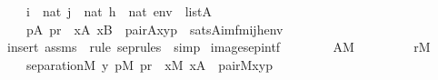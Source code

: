\begin{isabellebody}
\ \ \ \ {\isachardoublequoteopen}i\ {\isasymin}\ nat{\isachardoublequoteclose}\ {\isachardoublequoteopen}j\ {\isasymin}\ nat{\isachardoublequoteclose}\ {\isachardoublequoteopen}h\ {\isasymin}\ nat{\isachardoublequoteclose}\ {\isachardoublequoteopen}env\ {\isasymin}\ list{\isacharparenleft}{\kern0pt}A{\isacharparenright}{\kern0pt}{\isachardoublequoteclose}\isanewline
\ \ \isanewline
\ \ \ \ {\isachardoublequoteopen}{\isacharparenleft}{\kern0pt}{\isasymexists}p{\isasymin}A{\isachardot}{\kern0pt}\ p{\isasymin}r\ {\isacharampersand}{\kern0pt}\ {\isacharparenleft}{\kern0pt}{\isasymexists}x{\isasymin}A{\isachardot}{\kern0pt}\ x{\isasymin}B\ {\isacharampersand}{\kern0pt}\ pair{\isacharparenleft}{\kern0pt}{\isacharhash}{\kern0pt}{\isacharhash}{\kern0pt}A{\isacharcomma}{\kern0pt}x{\isacharcomma}{\kern0pt}y{\isacharcomma}{\kern0pt}p{\isacharparenright}{\kern0pt}{\isacharparenright}{\kern0pt}{\isacharparenright}{\kern0pt}\ {\isasymlongleftrightarrow}\ sats{\isacharparenleft}{\kern0pt}A{\isacharcomma}{\kern0pt}{\isacharquery}{\kern0pt}imfm{\isacharparenleft}{\kern0pt}i{\isacharcomma}{\kern0pt}j{\isacharcomma}{\kern0pt}h{\isacharparenright}{\kern0pt}{\isacharcomma}{\kern0pt}env{\isacharparenright}{\kern0pt}{\isachardoublequoteclose}\isanewline
%
\isadelimproof
\ \ %
\endisadelimproof
%
\isatagproof
{}\isamarkupfalse%
\ {\isacharparenleft}{\kern0pt}insert\ assms\ {\isacharsemicolon}{\kern0pt}\ {\isacharparenleft}{\kern0pt}rule\ sep{\isacharunderscore}{\kern0pt}rules\ {\isacharbar}{\kern0pt}\ simp{\isacharparenright}{\kern0pt}{\isacharplus}{\kern0pt}{\isacharparenright}{\kern0pt}%
\endisatagproof
{\isafoldproof}%
%
\isadelimproof
\isanewline
%
\endisadelimproof
\isanewline
{}\isamarkupfalse%
\ image{\isacharunderscore}{\kern0pt}sep{\isacharunderscore}{\kern0pt}intf\ {\isacharcolon}{\kern0pt}\isanewline
\ \ \isanewline
\ \ \ \ {\isachardoublequoteopen}A{\isasymin}M{\isachardoublequoteclose}\isanewline
\ \ \ \ \isanewline
\ \ \ \ {\isachardoublequoteopen}r{\isasymin}M{\isachardoublequoteclose}\isanewline
\ \ \isanewline
\ \ \ \ {\isachardoublequoteopen}separation{\isacharparenleft}{\kern0pt}{\isacharhash}{\kern0pt}{\isacharhash}{\kern0pt}M{\isacharcomma}{\kern0pt}\ {\isasymlambda}y{\isachardot}{\kern0pt}\ {\isasymexists}p{\isasymin}M{\isachardot}{\kern0pt}\ p{\isasymin}r\ {\isacharampersand}{\kern0pt}\ {\isacharparenleft}{\kern0pt}{\isasymexists}x{\isasymin}M{\isachardot}{\kern0pt}\ x{\isasymin}A\ {\isacharampersand}{\kern0pt}\ pair{\isacharparenleft}{\kern0pt}{\isacharhash}{\kern0pt}{\isacharhash}{\kern0pt}M{\isacharcomma}{\kern0pt}x{\isacharcomma}{\kern0pt}y{\isacharcomma}{\kern0pt}p{\isacharparenright}{\kern0pt}{\isacharparenright}{\kern0pt}{\isacharparenright}{\kern0pt}{\isachardoublequoteclose}\isanewline

\end{isabellebody}
